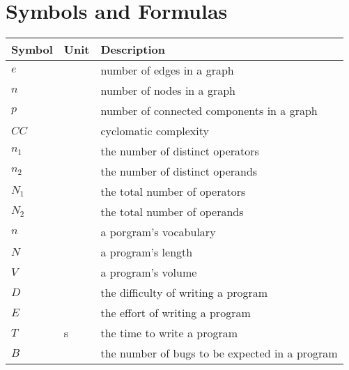 \cleardoublepage
\section*{Symbols and Formulas}


\begin{table}[h!]
\begin{tabularx}{\linewidth}{p{2cm} p{1cm} X}
\textbf{Symbol} & \textbf{Unit} & \textbf{Description} \\
\hline\hline
$e$             &               & number of edges in a graph\\
$n$             &               & number of nodes in a graph\\
$p$             &               & number of connected components in a graph\\
$CC$            &               & cyclomatic complexity\\
$n_1$           &               & the number of distinct operators\\
$n_2$           &               & the number of distinct operands\\
$N_1$           &               & the total number of operators\\
$N_2$           &               & the total number of operands\\
$n$             &               & a porgram's vocabulary\\
$N$             &               & a program's length\\
$V$             &               & a program's volume\\
$D$             &               & the difficulty of writing a program\\
$E$             &               & the effort of writing a program\\
$T$             & \unit{s}      & the time to write a program\\
$B$             &               & the number of bugs to be expected in a program\\
\end{tabularx}
\end{table}
